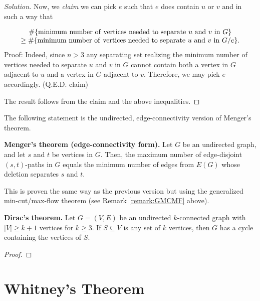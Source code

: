 \begin{proof}[Solution]
Now, we {\it claim} we can pick $e$ such that $e$ does contain $u$ or $v$
and in such a way that

\[
\begin{array}{c}
\# \{{\rm minimum\ number \ of\ vertices\ needed\ to\ separate\ }u\
{\rm and\  }v\ {\rm in\ }G\}\\
\geq
\# \{{\rm minimum\ number \ of\ vertices\ needed\ to\ separate\ }u\
{\rm and\  }v\ {\rm in}\ G/e\}.
\end{array}
\]
Proof: Indeed, since $n>3$ any separating set realizing
the minimum number  of vertices needed to separate $u$ and
$v$ in $G$ cannot contain both a vertex in $G$ adjacent to $u$ and a vertex in
$G$ adjacent to $v$. Therefore, we may pick $e$ accordingly.
(Q.E.D. claim)

The result follows from the claim and the above inequalities.
\end{proof}

The following statement
is the undirected, edge-connectivity version of
Menger's theorem.

\begin{theorem}
\textbf{Menger's theorem (edge-connectivity form).}
{\rm
Let $G$ be an undirected graph, and let $s$ and $t$ be vertices in
$G$.
Then, the maximum number of edge-disjoint $(s,t)$-paths in
$G$
equals the minimum number of edges from $E(G)$ whose
deletion separates $s$ and $t$.
}
\end{theorem}

This is proven the same way as the previous version
but using the generalized min-cut/max-flow theorem (see
Remark \ref{remark:GMCMF} above).

\begin{theorem}
\textbf{Dirac's theorem.}
Let $G = (V,E)$ be an undirected $k$-connected graph with
$|V| \geq k + 1$ vertices for $k \geq 3$. If $S \subseteq V$ is any
set of $k$ vertices, then $G$ has a cycle containing the vertices of
$S$.
\end{theorem}

\begin{proof}
\end{proof}



\section{Whitney's Theorem}


